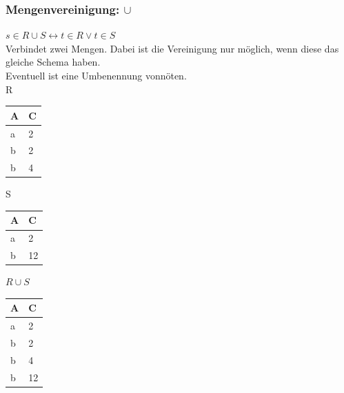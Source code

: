 \documentclass{article}
\begin{document}
 	\subsubsection{Mengenvereinigung: \texorpdfstring{$\cup$}{}}
 	$s\in R \cup S \leftrightarrow t\in R \lor t\in S$ \\
 	Verbindet zwei Mengen. Dabei ist die Vereinigung nur möglich, wenn diese das gleiche Schema haben. \\
 	Eventuell ist eine Umbenennung vonnöten. \\
 	R
 	 \begin{tabular}{| l | l |}
 		\toprule
 		A & C  \\ \midrule
 		a & 2  \\
 		b & 2 \\
 		b & 4 \\
 		\bottomrule
 	\end{tabular} \hspace{0.5cm}
 	S
 	\begin{tabular}{| l | l |}
 		\toprule
 		A & C  \\ \midrule
 		a & 2  \\
 		b & 12 \\
 		\bottomrule
 	\end{tabular} \hspace{0.5cm}
 	$R\cup S$
 	\begin{tabular}{| l | l |}
 		\toprule
 		A & C  \\ \midrule
 		a & 2  \\
 		b & 2 \\
 		b & 4 \\
 		b & 12 \\
 		\bottomrule
 	\end{tabular}
\end{document}

